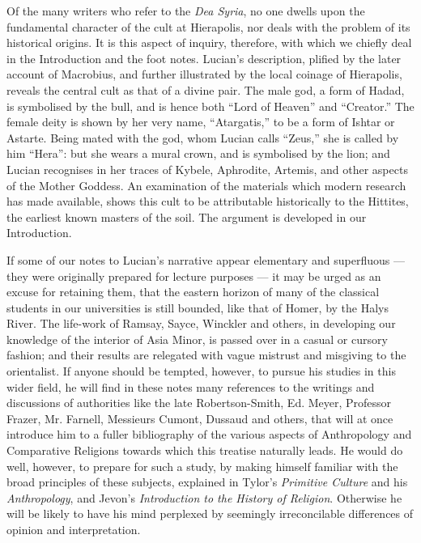 \documentclass[a4paper, 11pt, oneside, polutonikogreek, english]{article}
\begin{document}
Of the many writers who refer to the \emph{Dea Syria}, no one dwells upon the fundamental character of the cult at Hierapolis, nor deals with the problem of its historical origins. It is this aspect of inquiry, therefore, with which we chiefly deal in the Introduction and the foot notes. Lucian's description, plified by the later account of Macrobius, and further illustrated by the local coinage of Hierapolis, reveals the central cult as that of a divine pair. The male god, a form of Hadad, is symbolised by the bull, and is hence both ``Lord of Heaven'' and ``Creator.'' The female deity is shown by her very name, ``Atargatis,'' to be a form of Ishtar or Astarte. Being mated with the god, whom Lucian calls ``Zeus,'' she is called by him ``Hera'': but she wears a mural crown, and is symbolised by the lion; and Lucian recognises in her traces of Kybele, Aphrodite, Artemis, and other aspects of the Mother Goddess. An examination of the materials which modern research has made available, shows this cult to be attributable historically to the Hittites, the earliest known masters of the soil. The argument is developed in our Introduction.

If some of our notes to Lucian's narrative appear elementary and superfluous --- they were originally prepared for lecture purposes --- it may be urged as an excuse for retaining them, that the eastern horizon of many of the classical students in our universities is still bounded, like that of Homer, by the Halys River. The life-work of Ramsay, Sayce, Winckler and others, in developing our knowledge of the interior of Asia Minor, is passed over in a casual or cursory fashion; and their results are relegated with vague mistrust and misgiving to the orientalist. If anyone should be tempted, however, to pursue his studies in this wider field, he will find in these notes many references to the writings and discussions of authorities like the late Robertson-Smith, Ed. Meyer, Professor Frazer, Mr. Farnell, Messieurs Cumont, Dussaud and others, that will at once introduce him to a fuller bibliography of the various aspects of Anthropology and Comparative Religions towards which this treatise naturally leads. He would do well, however, to prepare for such a study, by making himself familiar  with the broad principles of these subjects, explained in Tylor's \emph{Primitive Culture} and his \emph{Anthropology}, and Jevon's \emph{Introduction to the History of Religion}. Otherwise he will be likely to have his mind perplexed by seemingly irreconcilable differences of opinion and interpretation.
\end{document}
